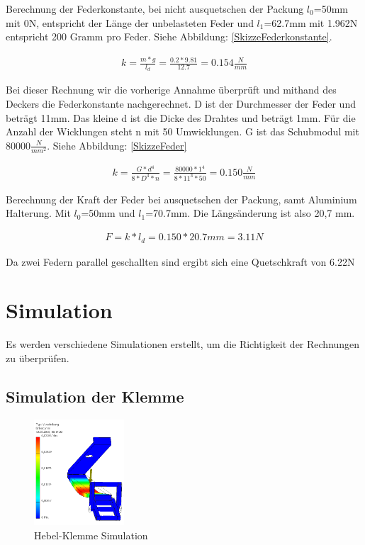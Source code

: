 Berechnung der Federkonstante, bei nicht ausquetschen der Packung $l_0$=50mm mit 0N, entspricht der Länge der unbelasteten Feder und $l_1$=62.7mm mit 1.962N entspricht 200 Gramm pro Feder. Siehe Abbildung: \ref{SkizzeFederkonstante}.

\begin{align*}
k =\frac{m*g}{l_d} = \frac{0.2*9.81}{12.7} = 0.154\frac{N}{mm}
\end{align*}

Bei dieser Rechnung wir die vorherige Annahme überprüft und mithand des Deckers die Federkonstante nachgerechnet. D ist der Durchmesser der Feder und beträgt 11mm. Das kleine d ist die Dicke des Drahtes und beträgt 1mm. Für die Anzahl der Wicklungen steht n mit 50 Umwicklungen. G ist das Schubmodul mit 80000$\frac{N}{mm^{2}}$. Siehe Abbildung: \ref{SkizzeFeder}

\begin{align*}
k=\frac{G*d^{4}}{8*D^{3}*n}=\frac{80000*1^{4}}{8*11^{3}*50} = 0.150\frac{N}{mm}
\end{align*} 

Berechnung der Kraft der Feder bei ausquetschen der Packung, samt Aluminium Halterung. Mit $l_0$=50mm und $l_1$=70.7mm. Die Längsänderung ist also 20,7 mm.

\begin{align*}
F=k*l_d=0.150*20.7mm = 3.11N
\end{align*}

Da zwei Federn parallel geschallten sind ergibt sich eine Quetschkraft von 6.22N

\section{Simulation}
Es werden verschiedene Simulationen erstellt, um die Richtigkeit der Rechnungen zu überprüfen.

\subsection{Simulation der Klemme}

\begin{figure}
\vspace{-60pt}
  \begin{center}
    \includegraphics[width=0.3\textwidth]{Bilder/Simulation/Hebel}
  \end{center}
  \caption{Hebel-Klemme Simulation}
  \label{Hebel-Klemme_Simulation}
\end{figure}


